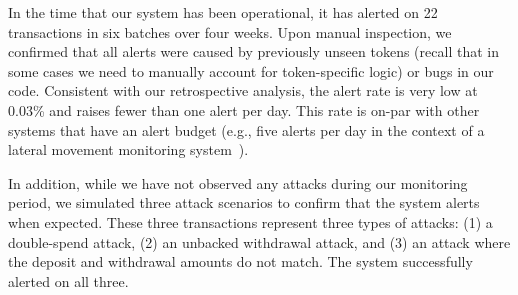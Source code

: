 In the time that our system has been operational, it has alerted on 22 transactions in six batches over four weeks. Upon manual inspection, we confirmed that all alerts were caused by previously unseen tokens (recall that in some cases we need to manually account for token-specific logic) or bugs in our code. Consistent with our retrospective analysis, the alert rate is very low at 0.03\% and raises fewer than one alert per day. This rate is on-par with other systems that have an alert budget (e.g., five alerts per day in the context of a lateral movement monitoring system~\cite{ho2021hopper}).

In addition, while we have not observed any attacks during our
monitoring period, we simulated three attack scenarios to confirm that
the system alerts when expected.  These three transactions represent
three types of attacks: (1) a double-spend attack, (2) an
unbacked withdrawal attack, and (3) an attack where the deposit and
withdrawal amounts do not match. The system successfully alerted on
all three. %

